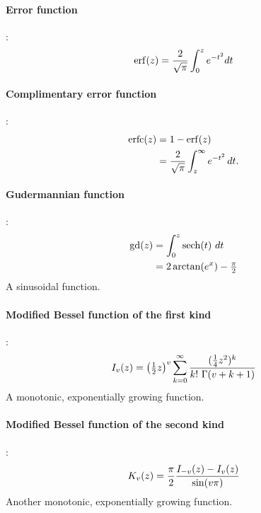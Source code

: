 \paragraph*{Error function}\hspace{-0.8em}\cite{Abramowitz1965}:
\begin{align*}
\operatorname{erf}(z) = \frac{2}{\sqrt{\pi}}\int_0^z e^{-t^2} dt		
\end{align*}


\paragraph*{Complimentary error function}\hspace{-0.8em}\cite{Abramowitz1965}:
\begin{align*}
             \operatorname{erfc}(z) & = 1-\operatorname{erf}(z) 		 \\
                                    & = \frac{2}{\sqrt{\pi}} \int_z^{\infty} e^{-t^2}\,dt. 
\end{align*}


\paragraph*{Gudermannian function}\hspace{-0.8em}\cite{Abramowitz1965}:
\begin{align*}
\operatorname{gd}(z) & = \int_0^{z} \operatorname{sech}(t)\  dt 				 \\			
& = 2 \arctan(e^x) - \tfrac{\pi}{2}					
\end{align*}
A sinusoidal function. 

\paragraph*{Modified Bessel function of the first kind}\hspace{-0.8em}\cite{Abramowitz1965}:
\label{ModBesselFirst}
\[
I_v(z) = \Left(\half z \Right)^v \sum_{k=0}^{\infty}  \frac{ (\sfrac{1}{4} z^2)^k } { k!\ \Gamma(v+k+1)}
\checked
\notag
\]
A monotonic, exponentially growing function. 

\paragraph*{Modified Bessel function of the second kind}\hspace{-0.8em}\cite{Abramowitz1965}: %
\label{ModBesselSecond}
\[
K_v(z) =  \frac{\pi}{2} \frac{I_{-v} (z) - I_v (z)}{\sin (v \pi)}
\checked
\notag
\]
Another monotonic, exponentially growing function. 



